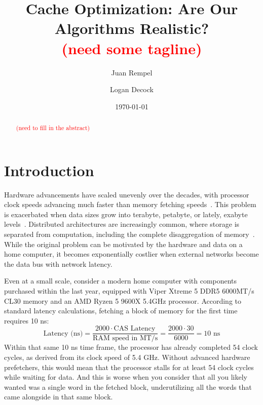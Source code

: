 \documentclass[11pt, letterpaper]{article}
\title{Cache Optimization: Are Our Algorithms Realistic?\\
\large \textcolor{red}{(need some tagline)}}
\author{Juan Rempel \and Logan Decock}
\date{\today}
\begin{document}
\maketitle

\begin{abstract}

    \textcolor{red}{(need to fill in the abstract)}

\end{abstract}

\section{Introduction}


Hardware advancements have scaled unevenly over the decades, with processor clock speeds advancing much faster than memory fetching speeds~\cite{wulf_memorywall}. This problem is exacerbated when data sizes grow into terabyte, petabyte, or lately, exabyte levels~\cite{boureima_exabyte}. Distributed architectures are increasingly common, where storage is separated from computation, including the complete disaggregation of memory~\cite{shan_disaggregation}. While the original problem can be motivated by the hardware and data on a home computer, it becomes exponentially costlier when external networks become the data bus with network latency.

Even at a small scale, consider a modern home computer with components purchased within the last year, equipped with Viper Xtreme 5 DDR5 6000MT/s CL30 memory and an AMD Ryzen 5 9600X 5.4GHz processor. According to standard latency calculations, fetching a block of memory for the first time requires 10 ns: 
\[
    \text{Latency (ns)} = \frac{2000 \cdot \text{CAS Latency}}{\text{RAM speed in MT/s}} = \frac{2000 \cdot 30}{6000} = 10 \text{ ns} 
\]
Within that same 10 ns time frame, the processor has already completed 54 clock cycles, as derived from its clock speed of 5.4 GHz. Without advanced hardware prefetchers, this would mean that the processor stalls for at least 54 clock cycles while waiting for data. And this is worse when you consider that all you likely wanted was a single word in the fetched block, underutilizing all the words that came alongside in that same block.
\end{document}
